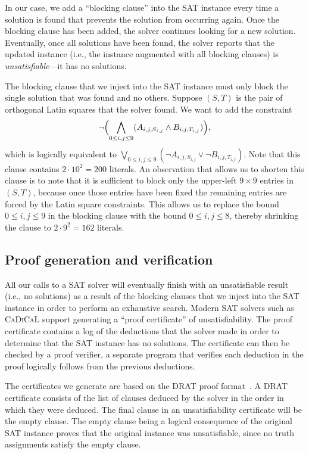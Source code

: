 \documentclass[runningheads]{llncs}
\begin{document}
In our case, we add a ``blocking clause'' into the SAT instance
every time a solution is found that prevents the solution from occurring again.  Once the blocking
clause has been added, the solver
continues looking for a new solution.  Eventually, once all solutions have been found, the solver
reports that the updated instance (i.e., the instance augmented with all blocking clauses)
is \emph{unsatisfiable}---it has no solutions.

The blocking clause that we inject into the SAT instance must only block the single
solution that was found and no others.  Suppose $(S,T)$ is the pair of orthogonal Latin squares
that the solver found.  We want to add the constraint
\begin{equation} \lnot\Bigl( \bigwedge_{0\leq i,j\leq9} (A_{i,j,S_{i,j}}\land B_{i,j,T_{i,j}}) \Bigr) , \end{equation}
which is logically equivalent to
$\bigvee_{0\leq i,j\leq9}(\lnot A_{i,j,S_{i,j}}\lor\lnot B_{i,j,T_{i,j}})$.
Note that this clause contains $2\cdot10^2=200$ literals.  An observation that allows us to shorten
this clause is to note that it is sufficient to block only the upper-left $9\times9$ entries
in $(S,T)$, because once those entries have been fixed the remaining entries are forced by the
Latin square constraints.  This allows us to replace the bound $0\leq i,j\leq9$ in the blocking clause
with the bound $0\leq i,j\leq8$, thereby shrinking the clause to $2\cdot9^2=162$ literals.

\subsection{Proof generation and verification}\label{sec:proofs}

All our calls to a SAT solver will eventually finish with an unsatisfiable result (i.e., no solutions)
as a result of the blocking clauses that we inject into the SAT instance in order to perform an exhaustive search.
Modern SAT solvers such as \textsc{CaDiCaL} support generating a ``proof certificate'' of unsatisfiability.
The proof certificate contains a log of the deductions that the solver
made in order to determine that the SAT instance has no solutions.  The certificate can then be checked by a proof
verifier, a separate program that verifies each deduction in the proof logically follows from the previous deductions.

The certificates we generate are based on the DRAT proof format~\cite{Wetzler2014}.
A DRAT certificate consists of the list of clauses deduced by the solver
in the order in which they were deduced.  The final clause in an unsatisfiability certificate
will be the empty clause.  The empty clause being a logical consequence of the original SAT instance
proves that the original instance was unsatisfiable, since no truth assignments satisfy the empty clause.
\end{document}
